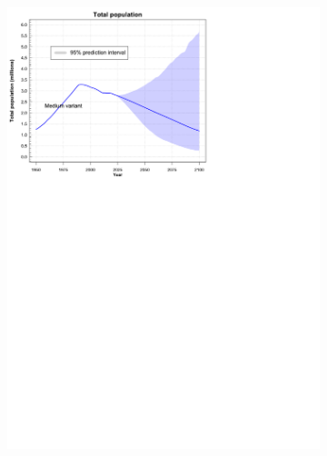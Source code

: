 \begin{figure}[H]
    \centering
    \begin{subfigure}[b]{0.32\textwidth}
        \centering
        \includegraphics[width=\textwidth]{photos/1-Total population.html.pdf}
    \end{subfigure}
    \hfill
    \begin{subfigure}[b]{0.32\textwidth}
        \centering

\end{subfigure}
\end{figure}
